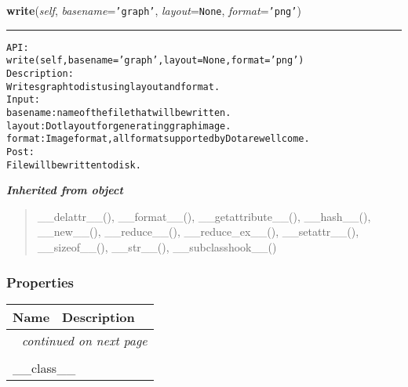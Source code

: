     \label{coinor:gimpy:graph:Graph:write}

    \vspace{0.5ex}

\hspace{.8\funcindent}\begin{boxedminipage}{\funcwidth}

    \raggedright \textbf{write}(\textit{self}, \textit{basename}={\tt \texttt{'}\texttt{graph}\texttt{'}}, \textit{layout}={\tt None}, \textit{format}={\tt \texttt{'}\texttt{png}\texttt{'}})

    \vspace{-1.5ex}

    \rule{\textwidth}{0.5\fboxrule}
\setlength{\parskip}{2ex}
\begin{alltt}

API:
    write(self, basename = 'graph', layout = None, format='png')
Description:
Writes graph to dist using layout and format.
Input:
    basename: name of the file that will be written.
    layout: Dot layout for generating graph image.
    format: Image format, all format supported by Dot are wellcome.
Post:
    File will be written to disk.
\end{alltt}

\setlength{\parskip}{1ex}
    \end{boxedminipage}


\large{\textbf{\textit{Inherited from object}}}

\begin{quote}
\_\_delattr\_\_(), \_\_format\_\_(), \_\_getattribute\_\_(), \_\_hash\_\_(), \_\_new\_\_(), \_\_reduce\_\_(), \_\_reduce\_ex\_\_(), \_\_setattr\_\_(), \_\_sizeof\_\_(), \_\_str\_\_(), \_\_subclasshook\_\_()
\end{quote}


  \subsubsection{Properties}

    \vspace{-1cm}
\hspace{\varindent}\begin{longtable}{|p{\varnamewidth}|p{\vardescrwidth}|l}
\cline{1-2}
\cline{1-2} \centering \textbf{Name} & \centering \textbf{Description}& \\
\cline{1-2}
\endhead\cline{1-2}\multicolumn{3}{r}{\small\textit{continued on next page}}\\\endfoot\cline{1-2}
\endlastfoot\multicolumn{2}{|l|}{\textit{Inherited from object}}\\
\multicolumn{2}{|p{\varwidth}|}{\raggedright \_\_class\_\_}\\
\cline{1-2}
\end{longtable}

